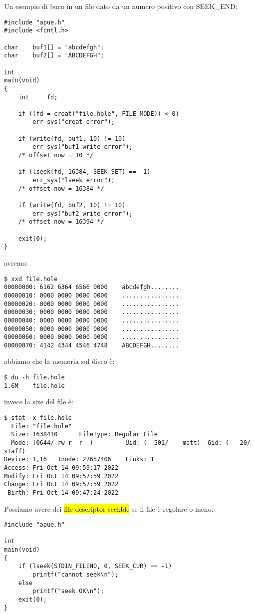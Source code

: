 Un esempio di buco in un file dato da un numero positivo con SEEK\_END:

\begin{lstlisting}
#include "apue.h"
#include <fcntl.h>

char	buf1[] = "abcdefgh";
char	buf2[] = "ABCDEFGH";

int
main(void)
{
	int		fd;

	if ((fd = creat("file.hole", FILE_MODE)) < 0)
		err_sys("creat error");

	if (write(fd, buf1, 10) != 10)
		err_sys("buf1 write error");
	/* offset now = 10 */

	if (lseek(fd, 16384, SEEK_SET) == -1)
		err_sys("lseek error");
	/* offset now = 16384 */

	if (write(fd, buf2, 10) != 10)
		err_sys("buf2 write error");
	/* offset now = 16394 */

	exit(0);
}	
\end{lstlisting}

avremo:

\begin{lstlisting}
$ xxd file.hole
00000000: 6162 6364 6566 0000    abcdefgh........
00000010: 0000 0000 0000 0000    ................
00000020: 0000 0000 0000 0000    ................
00000030: 0000 0000 0000 0000    ................
00000040: 0000 0000 0000 0000    ................
00000050: 0000 0000 0000 0000    ................
00000060: 0000 0000 0000 0000    ................
00000070: 4142 4344 4546 4748    ABCDEFGH........
\end{lstlisting}

abbiamo che la memoria sul disco è:

\begin{lstlisting}
$ du -h file.hole 
1.6M	file.hole
\end{lstlisting}

invece la size del file è:

\begin{lstlisting}
$ stat -x file.hole 
  File: "file.hole"
  Size: 1638410      FileType: Regular File
  Mode: (0644/-rw-r--r--)         Uid: (  501/    matt)  Gid: (   20/   staff)
Device: 1,16   Inode: 27657406    Links: 1
Access: Fri Oct 14 09:59:17 2022
Modify: Fri Oct 14 09:57:59 2022
Change: Fri Oct 14 09:57:59 2022
 Birth: Fri Oct 14 09:47:24 2022
\end{lstlisting}

Possiamo avere dei \hl{file descriptor seekble} se il file è regolare o meno:

\begin{lstlisting}
#include "apue.h"

int
main(void)
{
	if (lseek(STDIN_FILENO, 0, SEEK_CUR) == -1)
		printf("cannot seek\n");
	else
		printf("seek OK\n");
	exit(0);
}
\end{lstlisting}


